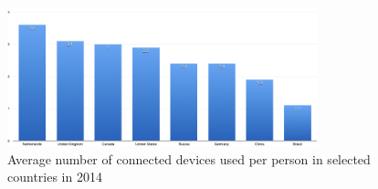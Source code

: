 \documentclass[a4paper,11pt]{article}
\begin{document}
\begin{figure}[h]
    \centering
    \includegraphics[width=0.8\textwidth]{chart}
    \caption{Average number of connected devices used per person in selected countries in 2014}
    \label{fig:chart}
\end{figure}
\end{document}
